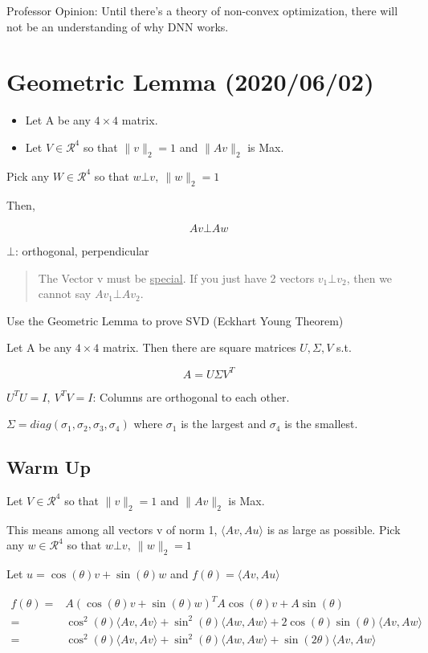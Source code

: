 \documentclass[11pt]{article}
\begin{document}
Professor Opinion: Until there's a theory of non-convex optimization, there will
not be an understanding of why DNN works.
\section{Geometric Lemma (2020/06/02)}
\label{sec:org61eb6f1}

\begin{itemize}
\item Let A be any \(4 \times 4\) matrix.
\item Let \(V \in \mathcal R^4\) so that \(\|v\|_2 = 1\) and \(\|Av\|_2\) is Max.
\end{itemize}

Pick any \(W \in \mathcal R^4\) so that \(w \bot v, \ \|w\|_2 = 1\)

Then,

$$
Av \bot Aw
$$


\(\bot\): orthogonal, perpendicular

\begin{quote}
The Vector v must be \uline{special}. If you just have 2 vectors \(v_1 \bot v_2\), then
we cannot say \(Av_1 \bot Av_2\).
\end{quote}

Use the Geometric Lemma to prove SVD (Eckhart Young Theorem)


Let A be any \(4 \times 4\) matrix. Then there are square matrices \(U, \Sigma, V\)
s.t.

$$
A = U \Sigma V^T
$$

\(U^T U = I, \ V^T V = I\): Columns are orthogonal to each other.

\(\Sigma = diag(\sigma_1, \sigma_2, \sigma_3, \sigma_4)\) where \(\sigma_1\) is the
largest and \(\sigma_4\) is the smallest.


\subsection{Warm Up}
\label{sec:org12104ab}

Let \(V \in \mathcal R^4\) so that \(\|v\|_2 = 1\) and \(\|Av\|_2\) is Max.

This means among all vectors v of norm 1, \(\langle Av, Au \rangle\) is as large
as possible. Pick any \(w \in \mathcal R^4\) so that \(w \bot v, \ \|w\|_2 = 1\)


Let \(u = \cos(\theta) v + \sin (\theta) w\) and \(f(\theta) = \langle Av, Au \rangle\)

\begin{equation}
\begin{split}
f(\theta) = & A(\cos(\theta) v + \sin (\theta) w)^T A \cos(\theta) v + A \sin (\theta)\\
= & \cos^2 (\theta) \langle Av, Av \rangle + \sin^2 (\theta) \langle Aw, Aw \rangle + 2 \cos (\theta) \sin (\theta) \langle Av, Aw \rangle\\
= & \cos^2 (\theta) \langle Av, Av \rangle + \sin^2 (\theta) \langle Aw, Aw \rangle + \sin (2 \theta) \langle Av, Aw \rangle\\
\end{split}
\end{equation}
\end{document}
